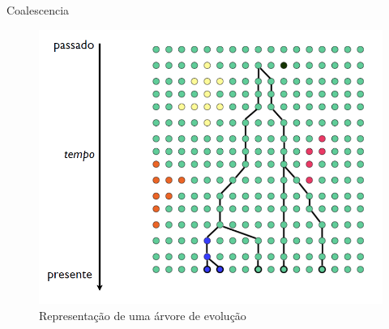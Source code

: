 \documentclass{beamer}
\begin{document}
   \begin{frame}{Coalescencia}
        \begin{figure}[!h]
            \centering
            \includegraphics[scale=0.3]{coal.png}
            \caption{Representação de uma árvore de evolução}
            \label{Rotulo}
        \end{figure}
   \end{frame}
\end{document}
